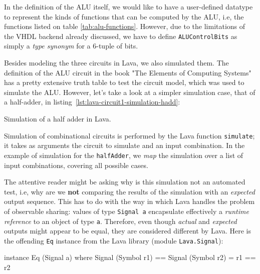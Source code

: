             In the definition of the ALU itself, we would like to have a user-defined datatype to
            represent the kinds of functions that can be computed by the ALU, i.e, the functions
            listed on table \ref{tab:alu-functions}. However, due to the limitations of the VHDL
            backend already discussed, we have to define \texttt{ALUControlBits} as simply a
            \emph{type synonym} for a 6-tuple of bits.

            Besides modeling the three circuits in Lava, we also simulated them. The definition of
            the ALU circuit in the book "The Elements of Computing Systems"\cite{nand2tetris-book}
            has a pretty extensive truth table to test the circuit model, which was used to simulate
            the ALU. However, let's take a look at a simpler simulation case, that of a half-adder,
            in listing~\ref{lst:lava-circuit1-simulation-hadd}:

            \begin{listing}[h!]
                \caption{Simulation of a half adder in Lava.
                    \label{lst:lava-circuit1-simulation-hadd}}
            \end{listing}

            Simulation of combinational circuits is performed by the Lava function
            \texttt{simulate}; it takes as arguments the circuit to simulate and an input
            combination. In the example of simulation for the \texttt{halfAdder}, we \emph{map} the
            simulation over a list of input combinations, covering all possible cases.

            The attentive reader might be asking why is this simulation not an automated test, i.e,
            why are we \textbf{not} comparing the results of the simulation with an \emph{expected}
            output sequence. This has to do with the way in which Lava handles the problem of
            observable sharing: values of type \texttt{Signal a} encapsulate effectively a
            \emph{runtime reference} to an object of type \texttt{a}. Therefore, even though
            \emph{actual} and \emph{expected} outputs might appear to be equal, they are considered
            different by Lava. Here is the offending \texttt{Eq} instance from the Lava library
            (module \texttt{Lava.Signal}):

            \begin{haskellcode}
        instance Eq (Signal a) where
            Signal (Symbol r1) == Signal (Symbol r2) = r1 == r2
            \end{haskellcode}

